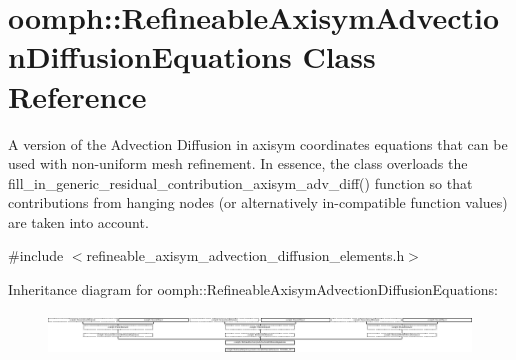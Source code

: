 \hypertarget{classoomph_1_1RefineableAxisymAdvectionDiffusionEquations}{}\section{oomph\+:\+:Refineable\+Axisym\+Advection\+Diffusion\+Equations Class Reference}
\label{classoomph_1_1RefineableAxisymAdvectionDiffusionEquations}


A version of the Advection Diffusion in axisym coordinates equations that can be used with non-\/uniform mesh refinement. In essence, the class overloads the fill\+\_\+in\+\_\+generic\+\_\+residual\+\_\+contribution\+\_\+axisym\+\_\+adv\+\_\+diff() function so that contributions from hanging nodes (or alternatively in-\/compatible function values) are taken into account.  




{\ttfamily \#include $<$refineable\+\_\+axisym\+\_\+advection\+\_\+diffusion\+\_\+elements.\+h$>$}

Inheritance diagram for oomph\+:\+:Refineable\+Axisym\+Advection\+Diffusion\+Equations\+:\begin{figure}[H]
\begin{center}
\leavevmode
\includegraphics[height=1.121795cm]{classoomph_1_1RefineableAxisymAdvectionDiffusionEquations}
\end{center}
\end{figure}
